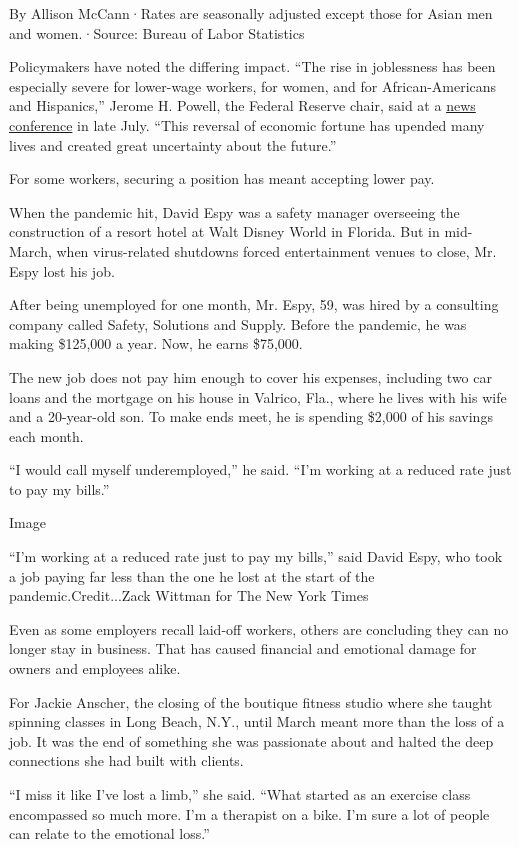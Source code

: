 By Allison McCann·Rates are seasonally adjusted except those for Asian
men and women.·Source: Bureau of Labor Statistics

Policymakers have noted the differing impact. ``The rise in joblessness
has been especially severe for lower-wage workers, for women, and for
African-Americans and Hispanics,'' Jerome H. Powell, the Federal Reserve
chair, said at a
\href{https://www.federalreserve.gov/mediacenter/files/FOMCpresconf20200729.pdf}{news
conference} in late July. ``This reversal of economic fortune has
upended many lives and created great uncertainty about the future.''

For some workers, securing a position has meant accepting lower pay.

When the pandemic hit, David Espy was a safety manager overseeing the
construction of a resort hotel at Walt Disney World in Florida. But in
mid-March, when virus-related shutdowns forced entertainment venues to
close, Mr. Espy lost his job.

After being unemployed for one month, Mr. Espy, 59, was hired by a
consulting company called Safety, Solutions and Supply. Before the
pandemic, he was making \$125,000 a year. Now, he earns \$75,000.

The new job does not pay him enough to cover his expenses, including two
car loans and the mortgage on his house in Valrico, Fla., where he lives
with his wife and a 20-year-old son. To make ends meet, he is spending
\$2,000 of his savings each month.

``I would call myself underemployed,'' he said. ``I'm working at a
reduced rate just to pay my bills.''

Image

``I'm working at a reduced rate just to pay my bills,'' said David Espy,
who took a job paying far less than the one he lost at the start of the
pandemic.Credit...Zack Wittman for The New York Times

Even as some employers recall laid-off workers, others are concluding
they can no longer stay in business. That has caused financial and
emotional damage for owners and employees alike.

For Jackie Anscher, the closing of the boutique fitness studio where she
taught spinning classes in Long Beach, N.Y., until March meant more than
the loss of a job. It was the end of something she was passionate about
and halted the deep connections she had built with clients.

``I miss it like I've lost a limb,'' she said. ``What started as an
exercise class encompassed so much more. I'm a therapist on a bike. I'm
sure a lot of people can relate to the emotional loss.''

